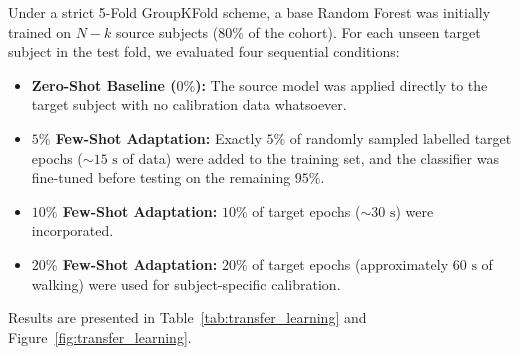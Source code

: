 \documentclass[11pt,a4paper]{article}
\renewcommand{\arraystretch}{1.15}
\begin{document}
Under a strict 5-Fold GroupKFold scheme, a base Random Forest was initially trained on $N-k$ source subjects ($80\%$ of the cohort). For each unseen target subject in the test fold, we evaluated four sequential conditions:
\begin{itemize}
    \item \textbf{Zero-Shot Baseline ($0\%$):} The source model was applied directly to the target subject with no calibration data whatsoever.
    \item \textbf{$5\%$ Few-Shot Adaptation:} Exactly $5\%$ of randomly sampled labelled target epochs ($\sim 15\text{ s}$ of data) were added to the training set, and the classifier was fine-tuned before testing on the remaining $95\%$.
    \item \textbf{$10\%$ Few-Shot Adaptation:} $10\%$ of target epochs ($\sim 30\text{ s}$) were incorporated.
    \item \textbf{$20\%$ Few-Shot Adaptation:} $20\%$ of target epochs (approximately $60\text{ s}$ of walking) were used for subject-specific calibration.
\end{itemize}

Results are presented in Table~\ref{tab:transfer_learning} and Figure~\ref{fig:transfer_learning}.

\begin{table}[htbp]
\centering
\caption{Few-Shot Transfer Learning and Subject-Specific Calibration Performance}
\label{tab:transfer_learning}
\vspace{0.4em}
\renewcommand{\arraystretch}{1.25}
\end{table}
\end{document}
